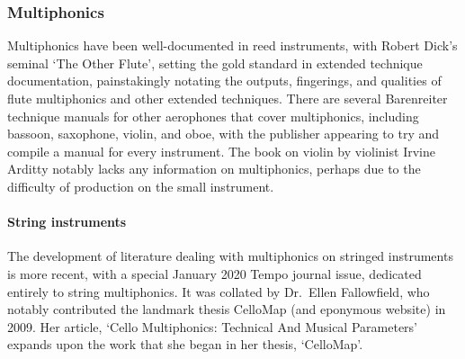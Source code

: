 \subsubsection{Multiphonics}
Multiphonics have been well-documented in reed instruments, with Robert Dick's seminal `The Other Flute', setting the gold standard in extended technique documentation, painstakingly notating the outputs, fingerings, and qualities of flute multiphonics and other extended techniques.\autocite{dickOtherFlute1989}
There are several Barenreiter technique manuals for other aerophones that cover multiphonics, including bassoon, saxophone, violin, and oboe, with the publisher appearing to try and compile a manual for every instrument.\autocite{weissTechniquesSaxophonePlaying2010,galloisTechniquesBassoonPlaying2009,ardittyTechniquesViolinPlaying2013, TODO:OboeBook}
The book on violin by violinist Irvine Arditty notably lacks any information on multiphonics, perhaps due to the difficulty of production on the small instrument.\autocite{ardittyTechniquesViolinPlaying2013}

\paragraph{String instruments}
The development of literature dealing with multiphonics on stringed instruments is more recent, with a special January 2020 Tempo journal issue, dedicated entirely to string multiphonics.
It was collated by Dr.\ Ellen Fallowfield, who notably contributed the landmark thesis CelloMap (and eponymous website) in 2009.\autocite{fallowfieldCelloMapHandbook2009, fallowfieldCelloMap}
Her article, `Cello Multiphonics: Technical And Musical Parameters' expands upon the work that she began in her thesis, `CelloMap'.\autocite{fallowfieldCelloMultiphonicsTechnical2020}

